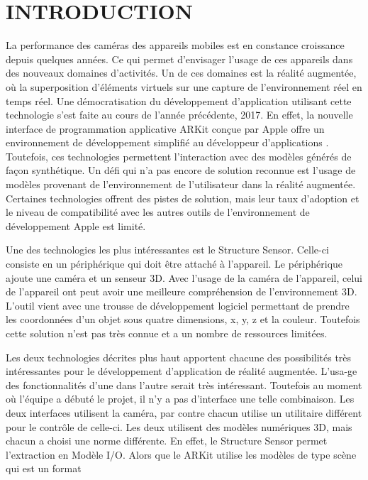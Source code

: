 \documentclass[letterpaper,twoside,12pt,french]{report}
\begin{document}
\chapter*{\uppercase{Introduction}}
La performance des caméras des appareils mobiles est en constance croissance depuis quelques
années. Ce qui permet d'envisager l'usage de ces appareils dans des nouveaux domaines d'activités.
Un de ces domaines est la réalité augmentée, où la superposition d'éléments virtuels sur une
capture de l'environnement réel en temps réel. Une démocratisation du développement d'application
utilisant cette technologie s'est faite au cours de l'année précédente, 2017. En effet, la nouvelle
interface de programmation applicative ARKit conçue par Apple offre un environnement de
développement simplifié au développeur d'applications \citep*{StattN2017}. Toutefois, ces technologies
permettent l'interaction avec des modèles générés de façon synthétique. Un défi qui n'a pas encore
de solution reconnue est l'usage de modèles provenant de l'environnement de l'utilisateur dans la
réalité augmentée. Certaines technologies offrent des pistes de solution, mais leur taux d'adoption
et le niveau de compatibilité avec les autres outils de l'environnement de développement Apple est
limité.
\par
Une des technologies les plus intéressantes est le Structure Sensor\citep*{molitchHou01}. Celle-ci
consiste en un périphérique qui doit être attaché à l'appareil. Le périphérique ajoute une caméra
et un senseur 3D. Avec l'usage de la caméra de l'appareil, celui de l'appareil ont peut avoir une
meilleure compréhension de l'environnement 3D. L'outil vient avec une trousse de développement
logiciel permettant de prendre les coordonnées d'un objet sous quatre dimensions, x, y, z et la
couleur. Toutefois cette solution n'est pas très connue et a un nombre de ressources limitées.
\par
Les deux technologies décrites plus haut apportent chacune des possibilités très intéressantes pour
le développement d'application de réalité augmentée. L'usa\hyp{}ge des fonctionnalités d'une dans l'autre
serait très intéressant. Toutefois au moment où l'équipe a débuté le projet, il n'y a pas
d'interface une telle combinaison. Les deux interfaces utilisent la caméra, par contre chacun
utilise un utilitaire différent pour le contrôle de celle-ci. Les deux utilisent des modèles
numériques 3D, mais chacun a choisi une norme différente. En effet, le Structure Sensor permet
l'extraction en Modèle I/O. Alors que le ARKit utilise les modèles de type scène qui est un format
\end{document}
